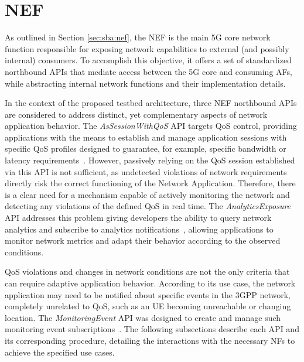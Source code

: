 \section{\acs{NEF}}
\label{chap:proposal:nef}

As outlined in Section \ref{sec:sba:nef}, the \acf{NEF} is the main \acs{5G} core network function responsible for exposing network capabilities to external (and possibly internal) consumers. To accomplish this objective, it offers a set of standardized northbound \acsp{API} that mediate access between the \acs{5G} core and consuming \acsp{AF}, while abstracting internal network functions and their implementation details.

In the context of the proposed testbed architecture, three \acs{NEF} northbound \acsp{API} are considered to address distinct, yet complementary aspects of network application behavior. The \textit{AsSessionWithQoS} \acs{API} targets \acs{QoS} control, providing applications with the means to establish and manage application sessions with specific \acs{QoS} profiles designed to guarantee, for example, specific bandwidth or latency requirements~\cite{ETSI_TS_129_122_V18_8_0}. However, passively relying on the \acs{QoS} session established via this \acs{API} is not sufficient, as undetected violations of network requirements directly risk the correct functioning of the Network Application. Therefore, there is a clear need for a mechanism capable of actively monitoring the network and detecting any violations of the defined \acs{QoS} in real time. The \textit{AnalyticsExposure} \acs{API} addresses this problem giving developers the ability to query network analytics and subscribe to analytics notifications~\cite{ETSI_TS_129_522_V18_11_0}, allowing applications to monitor network metrics and adapt their behavior according to the observed conditions.

\acs{QoS} violations and changes in network conditions are not the only criteria that can require adaptive application behavior. According to its use case, the network application may need to be notified about specific events in the \acs{3GPP} network, completely unrelated to \acs{QoS}, such as an \acs{UE} becoming unreachable or changing location. The \textit{MonitoringEvent} \acs{API} was designed to create and manage such monitoring event subscriptions~\cite{ETSI_TS_129_122_V18_8_0}. The following subsections describe each \acs{API} and its corresponding procedure, detailing the interactions with the necessary \acsp{NF} to achieve the specified use cases.


